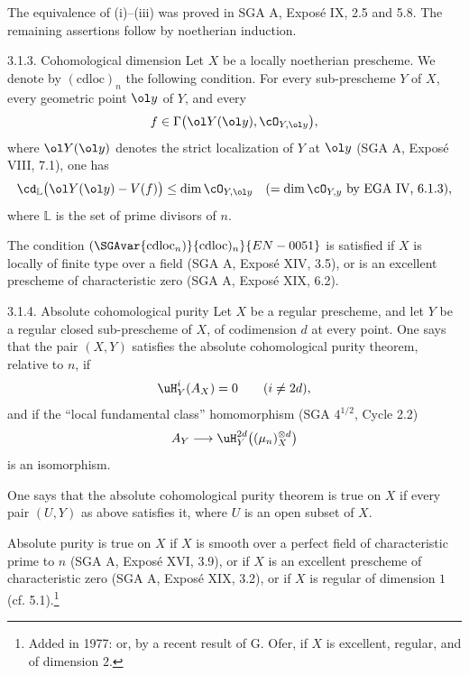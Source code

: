\begin{prooftext}
The equivalence of (i)--(iii) was proved in SGA A, Exposé IX, 2.5 and 5.8. The remaining assertions follow by noetherian induction. \qedtext
\end{prooftext}

\begin{statement}{3.1.3. Cohomological dimension}
Let $X$ be a locally noetherian prescheme. We denote by $(\mathrm{cdloc})_n$ the following condition. For every sub-prescheme $Y$ of $X$, every geometric point $\ol y$ of $Y$, and every
\[
   f\in\Gamma\bigl(\ol Y(\ol y),\cO_{Y,\ol y}\bigr),
\]
where $\ol Y(\ol y)$ denotes the strict localization of $Y$ at $\ol y$ (SGA A, Exposé VIII, 7.1), one has
\[
   \cd_{\mathbb{L}}\bigl(\ol Y(\ol y)-V(f)\bigr)
       \le \dim \cO_{Y,\ol y}
       \quad (=\dim \cO_{Y,y}\text{ by EGA IV, 6.1.3}),
\]
where $\mathbb{L}$ is the set of prime divisors of $n$.

The condition $(\SGAvar{\mathrm{cdloc}_n)}{\mathrm{cdloc})_n}{EN-0051}$ is satisfied if $X$ is locally of finite type over a field (SGA A, Exposé XIV, 3.5), or is an excellent prescheme of characteristic zero (SGA A, Exposé XIX, 6.2).
\end{statement}

\begin{statement}{3.1.4. Absolute cohomological purity}
Let $X$ be a regular prescheme, and let $Y$ be a regular closed sub-prescheme of $X$, of codimension $d$ at every point. One says that the pair $(X,Y)$ satisfies the absolute cohomological purity theorem, relative to $n$, if
\[
   \uH^i_Y(A_X)=0\qquad (i\ne 2d),
\]
and if the ``local fundamental class'' homomorphism (SGA $4^{1/2}$, Cycle 2.2)
\[
   A_Y\longrightarrow \uH^{2d}_Y\bigl((\mu_n)^{\otimes d}_X\bigr)
\]
is an isomorphism.

One says that the absolute cohomological purity theorem is true on $X$ if every pair $(U,Y)$ as above satisfies it, where $U$ is an open subset of $X$.

Absolute purity is true on $X$ if $X$ is smooth over a perfect field of characteristic prime to $n$ (SGA A, Exposé XVI, 3.9), or if $X$ is an excellent prescheme of characteristic zero (SGA A, Exposé XIX, 3.2), or if $X$ is regular of dimension $1$ (cf. 5.1).\footnote{Added in 1977: or, by a recent result of G. Ofer, if $X$ is excellent, regular, and of dimension $2$.}
\end{statement}

